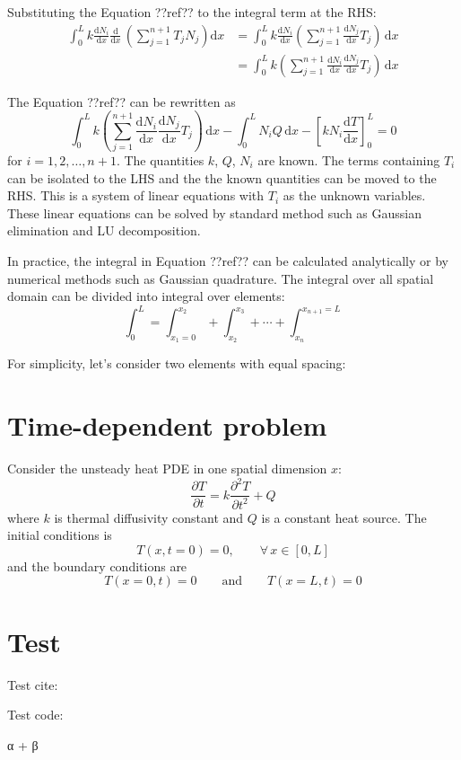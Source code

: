 \documentclass[a4paper,12pt]{article} %
\begin{document}
Substituting the Equation ??ref?? to the integral term at the RHS:
\begin{align}
\int_{0}^{L} k \frac{\mathrm{d} N_{i}}{\mathrm{d}x}
\frac{\mathrm{d}}{\mathrm{d}x}\, \left( \sum_{j=1}^{n+1} T_{j} N_{j} \right) \mathrm{d}x & =
\int_{0}^{L} k \frac{\mathrm{d} N_{i}}{\mathrm{d}x}
\left( \sum_{j=1}^{n+1} \frac{\mathrm{d}N_{j}}{\mathrm{d}x} T_{j} \right)\, \mathrm{d}x \\
& = \int_{0}^{L} k
\left( \sum_{j=1}^{n+1}
\frac{\mathrm{d} N_{i}}{\mathrm{d}x}
\frac{\mathrm{d}N_{j}}{\mathrm{d}x} T_{j} \right)\, \mathrm{d}x
\end{align}

The Equation ??ref?? can be rewritten as
\begin{equation}
\int_{0}^{L} k
\left( \sum_{j=1}^{n+1}
\frac{\mathrm{d} N_{i}}{\mathrm{d}x}
\frac{\mathrm{d}N_{j}}{\mathrm{d}x} T_{j} \right)\, \mathrm{d}x -
\int_{0}^{L} N_{i} Q\, \mathrm{d}x -
\left[ k N_{i} \frac{\mathrm{d}T}{\mathrm{d}x} \right]_{0}^{L} = 0
\end{equation}
for $i=1,2,\ldots,n+1$. The quantities $k$, $Q$, $N_{i}$ are known.
The terms containing $T_{i}$ can be isolated to the LHS and the
the known quantities can be moved to the RHS. This is a system
of linear equations with $T_{i}$ as the unknown variables. These linear equations
can be solved by standard method such as Gaussian elimination and LU decomposition.

In practice, the integral in Equation ??ref?? can be calculated analytically or
by numerical methods such as Gaussian quadrature. The integral over all spatial
domain can be divided into integral over elements:
\begin{equation}
\int_{0}^{L} = \int_{x_{1}=0}^{x_{2}} + \int_{x_{2}}^{x_{3}} + \cdots +
\int_{x_{n}}^{x_{n+1}=L}
\end{equation}

For simplicity, let's consider two elements with equal spacing:


\section{Time-dependent problem}

Consider the unsteady heat PDE in one spatial dimension $x$:
\begin{equation}
\frac{\partial T}{\partial t} = k \frac{\partial^2 T}{\partial t^2} + Q
\end{equation}
where $k$ is thermal diffusivity constant and $Q$ is a constant heat source.
%
The initial conditions is
\begin{equation}
T(x,t=0) = 0,\qquad \forall \, x \in [0,L]
\end{equation}
and the boundary conditions are
\begin{equation}
T(x=0,t) = 0 \qquad \text{and} \qquad T(x=L,t) = 0
\end{equation}


\section{Test}

Test cite: \cite{Heinrich2017}

Test code:
\begin{juliacode}
α + β
\end{juliacode}



\end{document}
